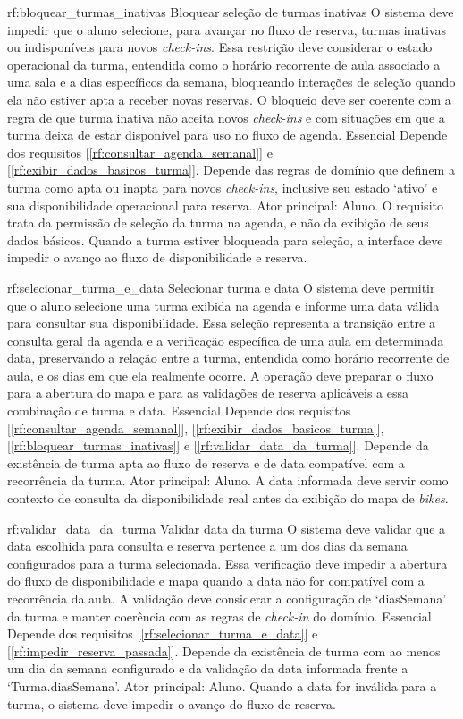 \reqfuncfull
{rf:bloquear_turmas_inativas}
{Bloquear seleção de turmas inativas}
{O sistema deve impedir que o aluno selecione, para avançar no fluxo de reserva, turmas inativas ou indisponíveis para novos \textit{check-ins}. Essa restrição deve considerar o estado operacional da turma, entendida como o horário recorrente de aula associado a uma sala e a dias específicos da semana, bloqueando interações de seleção quando ela não estiver apta a receber novas reservas. O bloqueio deve ser coerente com a regra de que turma inativa não aceita novos \textit{check-ins} e com situações em que a turma deixa de estar disponível para uso no fluxo de agenda.}
{Essencial}
{Depende dos requisitos [\ref{rf:consultar_agenda_semanal}] e [\ref{rf:exibir_dados_basicos_turma}]. Depende das regras de domínio que definem a turma como apta ou inapta para novos \textit{check-ins}, inclusive seu estado `ativo' e sua disponibilidade operacional para reserva.}
{Ator principal: Aluno. O requisito trata da permissão de seleção da turma na agenda, e não da exibição de seus dados básicos. Quando a turma estiver bloqueada para seleção, a interface deve impedir o avanço ao fluxo de disponibilidade e reserva.}

\reqfuncfull
{rf:selecionar_turma_e_data}
{Selecionar turma e data}
{O sistema deve permitir que o aluno selecione uma turma exibida na agenda e informe uma data válida para consultar sua disponibilidade. Essa seleção representa a transição entre a consulta geral da agenda e a verificação específica de uma aula em determinada data, preservando a relação entre a turma, entendida como horário recorrente de aula, e os dias em que ela realmente ocorre. A operação deve preparar o fluxo para a abertura do mapa e para as validações de reserva aplicáveis a essa combinação de turma e data.}
{Essencial}
{Depende dos requisitos [\ref{rf:consultar_agenda_semanal}], [\ref{rf:exibir_dados_basicos_turma}], [\ref{rf:bloquear_turmas_inativas}] e [\ref{rf:validar_data_da_turma}]. Depende da existência de turma apta ao fluxo de reserva e de data compatível com a recorrência da turma.}
{Ator principal: Aluno. A data informada deve servir como contexto de consulta da disponibilidade real antes da exibição do mapa de \textit{bikes}.}

\reqfuncfull
{rf:validar_data_da_turma}
{Validar data da turma}
{O sistema deve validar que a data escolhida para consulta e reserva pertence a um dos dias da semana configurados para a turma selecionada. Essa verificação deve impedir a abertura do fluxo de disponibilidade e mapa quando a data não for compatível com a recorrência da aula. A validação deve considerar a configuração de `diasSemana' da turma e manter coerência com as regras de \textit{check-in} do domínio.}
{Essencial}
{Depende dos requisitos [\ref{rf:selecionar_turma_e_data}] e [\ref{rf:impedir_reserva_passada}]. Depende da existência de turma com ao menos um dia da semana configurado e da validação da data informada frente a `Turma.diasSemana'.}
{Ator principal: Aluno. Quando a data for inválida para a turma, o sistema deve impedir o avanço do fluxo de reserva.}


